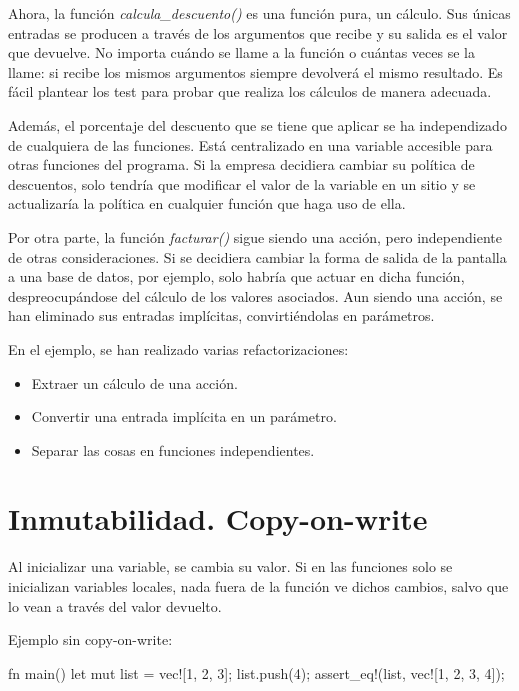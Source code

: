 Ahora, la función \textit{calcula\_descuento()} es una función pura, un cálculo. Sus únicas entradas se producen a través de los argumentos que recibe y su salida es el valor que devuelve. No importa cuándo se llame a la función o cuántas veces se la llame: si recibe los mismos argumentos siempre devolverá el mismo resultado. Es fácil plantear los test para probar que realiza los cálculos de manera adecuada. 

Además, el porcentaje del descuento que se tiene que aplicar se ha independizado de cualquiera de las funciones. Está centralizado en una variable accesible para otras funciones del programa. Si la empresa decidiera cambiar su política de descuentos, solo tendría que modificar el valor de la variable en un sitio y se actualizaría la política en cualquier función que haga uso de ella.

Por otra parte, la función \textit{facturar()} sigue siendo una acción, pero independiente de otras consideraciones. Si se decidiera cambiar la forma de salida de la pantalla a una base de datos, por ejemplo, solo habría que actuar en dicha función, despreocupándose del cálculo de los valores asociados. Aun siendo una acción, se han eliminado sus entradas implícitas, convirtiéndolas en parámetros.

En el ejemplo, se han realizado varias refactorizaciones:
\begin{itemize}
   \item Extraer un cálculo de una acción.
   \item Convertir una entrada implícita en un parámetro.
   \item Separar las cosas en funciones independientes.
\end{itemize}

\section{Inmutabilidad. Copy-on-write}

Al inicializar una variable, se cambia su valor. Si en las funciones solo se inicializan variables locales, nada fuera de la función ve dichos cambios, salvo que lo vean a través del valor devuelto. 

Ejemplo sin copy-on-write:

\vspace{0.7em}
\begin{Codigo}
   fn main() {
      let mut list = vec![1, 2, 3];
      list.push(4);
      assert_eq!(list, vec![1, 2, 3, 4]);
   }
\end{Codigo}

